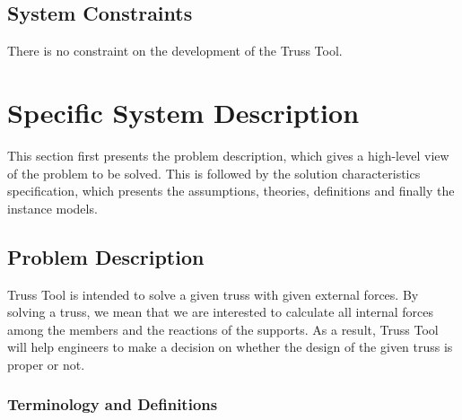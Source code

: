 \documentclass[12pt]{article}
\begin{document}
\subsection{System Constraints}

There is no constraint on the development of the Truss Tool.

\section{Specific System Description}

This section first presents the problem description, which gives a high-level view of the problem to be solved.  This is followed by the solution characteristics specification, which presents the assumptions, theories, definitions and finally the instance models.

\subsection{Problem Description} \label{Sec_pd}

Truss Tool is intended to solve a given truss with given external forces. By solving a truss, we mean that we are interested to calculate all internal forces among the members and the reactions of the supports. As a result, Truss Tool will help engineers to make a decision on whether the design of the given truss is proper or not.

\subsubsection{Terminology and  Definitions}

\end{document}
